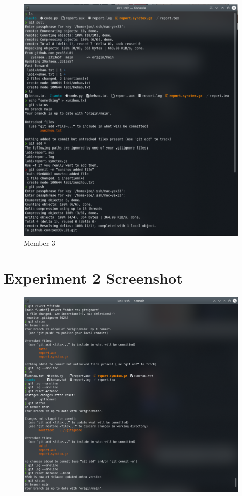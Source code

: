 \documentclass[titlepage, 12pt]{article}
\begin{document}
\begin{appendices}
\begin{figure}[H]
    \includegraphics[width=\textwidth]{e1m3}
    \caption{Member 3}
  \end{figure}

  \section{Experiment 2 Screenshot}
  \begin{figure}[H]
    \includegraphics[width=\textwidth]{e2}
  \end{figure}

\end{appendices}
\end{document}
